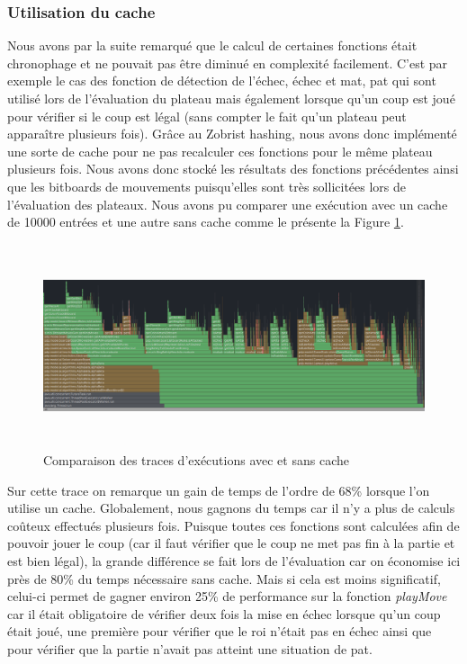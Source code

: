\documentclass{article}
\begin{document}
\subsubsection{Utilisation du cache}
 Nous avons par la suite
remarqué que le calcul de certaines fonctions était chronophage et ne pouvait pas être diminué en complexité facilement. C'est par exemple le cas des fonction de détection de
l'échec, échec et mat, pat qui sont utilisé lors de l'évaluation du plateau mais également lorsque qu'un coup est joué pour vérifier si le coup est légal (sans compter le fait
qu'un plateau peut apparaître plusieurs fois). Grâce au Zobrist hashing, nous avons donc implémenté une sorte de cache pour ne pas recalculer ces fonctions pour le même plateau
plusieurs fois. Nous avons donc stocké les résultats des fonctions précédentes ainsi que les bitboards de mouvements puisqu'elles sont très sollicitées lors de l'évaluation des
plateaux. Nous avons pu comparer une exécution avec un cache de 10000 entrées et une autre sans cache comme le présente la Figure \ref{cache_cmp}.

\begin{figure}[h]
    \centering
    \includegraphics[width=\textwidth,height=6.0cm,keepaspectratio]{cache_compare.png}
    \caption{Comparaison des traces d'exécutions avec et sans cache}
    \label{cache_cmp}
\end{figure}
\FloatBarrier

Sur cette trace on remarque un gain de temps de l'ordre de 68\% lorsque l'on utilise un cache. Globalement, nous gagnons du temps car il n'y a plus de calculs coûteux
effectués plusieurs fois. Puisque toutes ces fonctions sont calculées afin de pouvoir jouer le coup (car il faut vérifier que le coup ne met pas fin à la partie et 
est bien légal), la grande différence se fait lors de l'évaluation car on économise ici près de 80\% du temps nécessaire sans cache. Mais si cela est moins significatif,
celui-ci permet de gagner environ 25\% de performance sur la fonction \textit{playMove} car il était obligatoire de vérifier deux fois la mise en échec lorsque qu'un coup était joué,
une première pour vérifier que le roi n'était pas en échec ainsi que pour vérifier que la partie n'avait pas atteint une situation de pat.\\
\end{document}
